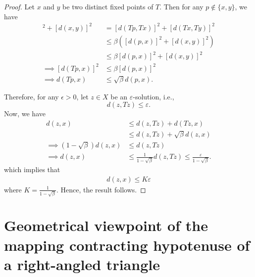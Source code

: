 \documentclass[11pt,reqno,a4paper]{amsart}
\theoremstyle{plain}
\theoremstyle{definition}
\theoremstyle{remark}
\numberwithin{equation}{section}
\begin{document}
\begin{proof}
    Let $x$ and $y$ be two distinct fixed points of $T$. Then for any $p \notin \{x, y\}$, we have
\begin{align*}
     [d(Tp,x)]^2 + [d(x,y)]^2 &= [d(Tp,Tx)]^2 + [d(Tx,Ty)]^2\\ 
    &\leq \beta ([d(p,x)]^2 + [d(x,y)]^2)\\
    &\leq \beta [d(p,x)]^2 + [d(x,y)]^2\\
    \implies [d(Tp,x)]^2 &\leq \beta [d(p,x)]^2\\
    \implies d(Tp,x) &\leq \sqrt{\beta} d(p,x).
\end{align*}

\noindent 
Therefore, for any $\epsilon > 0$, let $z \in X$ be an $\varepsilon$-solution, i.e., $$d(z,Tz) \leq \varepsilon.$$
Now, we have
\begin{align*}
    d(z,x) &\le d(z,Tz) + d(Tz,x) \\
    &\le d(z,Tz) + \sqrt{\beta} d(z,x) \\
    \implies (1- \sqrt{\beta}) d(z,x) &\le d(z,Tz)\\
    \implies d(z,x) &\le \frac{1}{1- \sqrt{\beta}} d(z,Tz) \le \frac{\varepsilon}{1- \sqrt{\beta}}.
\end{align*}
which implies that
\begin{align*}
    d(z,x) \le K \varepsilon
\end{align*}
where $K=\frac{1}{1- \sqrt{\beta}}$. Hence, the result follows.
\end{proof}


\section{Geometrical viewpoint of the mapping contracting hypotenuse of a right-angled triangle}



\end{document}
